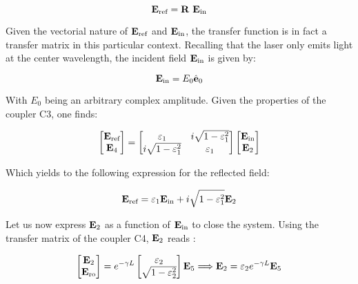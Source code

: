 \begin{equation}
	\mathbf{E}_{\text{ref}} = \mathbf{R} ~\mathbf{E}_{\text{in}}
\end{equation}

Given the vectorial nature of $\mathbf{E}_{\text{ref}}$ and $\mathbf{E}_{\text{in}}$, the transfer function is in fact a transfer matrix in this particular context. Recalling that the laser only emits light at the center wavelength, the incident field $\mathbf{E}_{\text{in}}$ is given by:

\begin{equation}
	\mathbf{E}_{\text{in}} = E_0 \hat{\mathbf{e}}_0
\end{equation}

With $E_0$ being an arbitrary complex amplitude. Given the properties of the coupler C3, one finds:

\begin{equation}
	\begin{bmatrix}
		\mathbf{E}_{\text{ref}}\\
		\mathbf{E}_{\text{4}}
	\end{bmatrix} = \begin{bmatrix}
		\varepsilon_1 & i\sqrt{1-\varepsilon_1^2} \\
		i\sqrt{1-\varepsilon_1^2} & \varepsilon_1
	\end{bmatrix}
	\begin{bmatrix}
		\mathbf{E}_{\text{in}}\\
		\mathbf{E}_{\text{2}}
	\end{bmatrix} 
\end{equation}

Which yields to the following expression for the reflected field:

\begin{equation}
	\mathbf{E}_{\text{ref}} = \varepsilon_1 \mathbf{E}_{\text{in}} + i \sqrt{1-\varepsilon_1^2} \mathbf{E}_{\text{2}}
	\label{eq-ref}
\end{equation}

Let us now express $\mathbf{E}_{\text{2}}$ as a function of $\mathbf{E}_{\text{in}}$ to close the system. Using the transfer matrix of the coupler C4, $\mathbf{E}_{\text{2}}$ reads :

\begin{equation}
	\begin{bmatrix}
		\mathbf{E}_{\text{2}}\\
		\mathbf{E}_{\text{ro}}
	\end{bmatrix} = e^{-\gamma L} \begin{bmatrix}
		\varepsilon_2\\
		\sqrt{1-\varepsilon_2^2}
	\end{bmatrix} \mathbf{E}_{\text{5}} \Longrightarrow \mathbf{E}_{\text{2}} = \varepsilon_2 e^{-\gamma L} \mathbf{E}_{\text{5}}
\end{equation}

